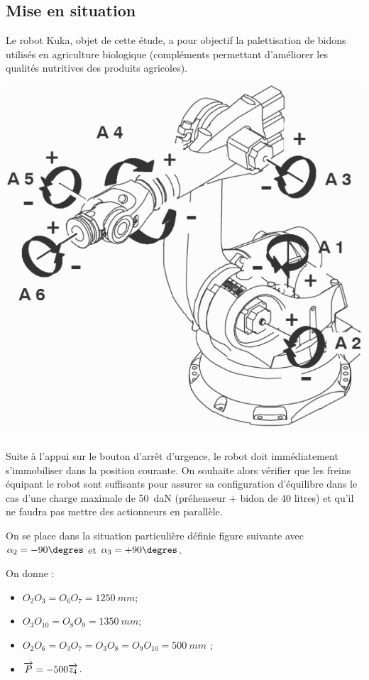 \documentclass[10pt,fleqn]{article} %
\begin{document}

\vspace{5cm}
\pagestyle{fancy}
\thispagestyle{plain}


\def\columnseprulecolor{\color{ocre}}
\setlength{\columnseprule}{0.4pt} 

\begin{multicols}{2}
\section*{Mise en situation}
\ifprof
\else
\fi

Le robot Kuka, objet de cette étude, a pour objectif la palettisation de bidons utilisés en agriculture biologique (compléments permettant d'améliorer les qualités nutritives des produits agricoles).


\begin{center}
\includegraphics[width=.6\linewidth]{images/fig_04}
\end{center}

\begin{obj}
Suite à  l’appui  sur  le bouton d’arrêt d’urgence, le robot doit immédiatement s’immobiliser dans la position courante. On souhaite alors  vérifier  que  les  freins  équipant  le  robot  sont  suffisants  pour  assurer  sa  configuration 
d’équilibre dans le cas d’une charge maximale de \SI{50}{daN} (préhenseur + bidon de 40 litres) et 
qu’il ne faudra pas mettre des actionneurs en parallèle. 
\end{obj}

On se place dans la situation particulière définie figure suivante avec  $\alpha_2= -90\degres$ et $\alpha_3 = +90\degres$. 

On donne :
\begin{itemize}
\item $O_2O_3 = O_6O_7 = \SI{1250}{mm}$; 
\item $O_3O_{10} = O_8O_9 = \SI{1350}{mm}$; 
\item $O_2O_6 = O_3O_7 = O_3O_8 = O_9O_{10} = \SI{500}{mm}$ ; 
\item $\overrightarrow{P} = -500\overrightarrow{z_4}$.
\end{itemize}


\end{multicols}
\end{document}
